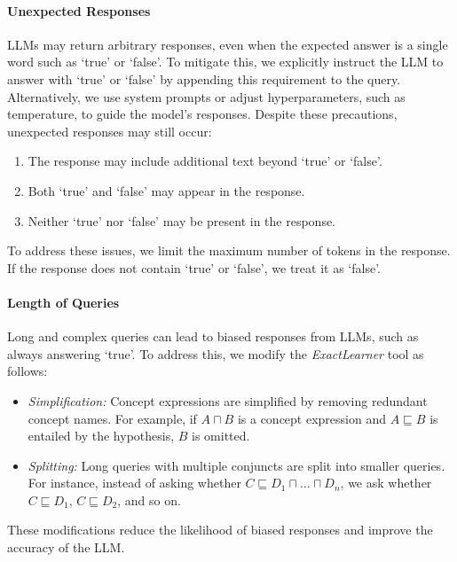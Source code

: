 \paragraph{Unexpected Responses}
\label{par:unexpected-responses}
%
\glspl{LLM} may return arbitrary responses, even when the expected answer is a single word such as `true' or `false'.
%
To mitigate this, we explicitly instruct the \gls{LLM} to answer with `true' or `false' by appending this requirement to the query.
%
Alternatively, we use system prompts or adjust hyperparameters, such as temperature, to guide the model's responses.
%
Despite these precautions, unexpected responses may still occur:
%
\begin{enumerate}
    \item The response may include additional text beyond `true' or `false'.
    \item Both `true' and `false' may appear in the response.
    \item Neither `true' nor `false' may be present in the response.
\end{enumerate}
%
To address these issues, we limit the maximum number of tokens in the response.
%
If the response does not contain `true' or `false', we treat it as `false'.


\paragraph{Length of Queries}
\label{par:length-of-queries}
%
Long and complex queries can lead to biased responses from \glspl{LLM}, such as always answering `true'.
%
To address this, we modify the \emph{ExactLearner} tool as follows:
%
\begin{itemize}
    \item \emph{Simplification:} Concept expressions are simplified by removing redundant concept names.
    For example, if $A \sqcap B$ is a concept expression and $A \sqsubseteq B$ is entailed by the hypothesis, $B$ is omitted.
    \item \emph{Splitting:} Long queries with multiple conjuncts are split into smaller queries.
    For instance, instead of asking whether $C \sqsubseteq D_1 \sqcap \ldots \sqcap D_n$, we ask whether $C \sqsubseteq D_1$, $C \sqsubseteq D_2$, and so on.
\end{itemize}
%
These modifications reduce the likelihood of biased responses and improve the accuracy of the \gls{LLM}.


